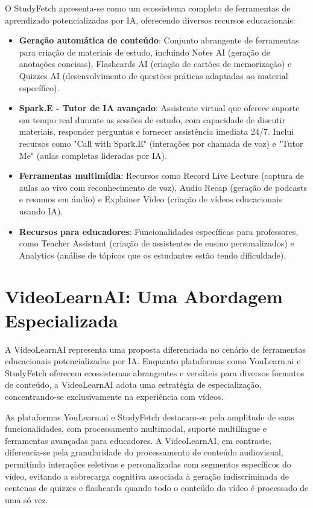 \documentclass[tcc,capa]{texufpel}
\begin{document}
O StudyFetch apresenta-se como um ecossistema completo de ferramentas de aprendizado potencializadas por IA, oferecendo diversos recursos educacionais:

\begin{itemize}
    \item \textbf{Geração automática de conteúdo}: Conjunto abrangente de ferramentas para criação de materiais de estudo, incluindo Notes AI (geração de anotações concisas), Flashcards AI (criação de cartões de memorização) e Quizzes AI (desenvolvimento de questões práticas adaptadas ao material específico).
    
    \item \textbf{Spark.E - Tutor de IA avançado}: Assistente virtual que oferece suporte em tempo real durante as sessões de estudo, com capacidade de discutir materiais, responder perguntas e fornecer assistência imediata 24/7. Inclui recursos como "Call with Spark.E" (interações por chamada de voz) e "Tutor Me" (aulas completas lideradas por IA).
    
    \item \textbf{Ferramentas multimídia}: Recursos como Record Live Lecture (captura de aulas ao vivo com reconhecimento de voz), Audio Recap (geração de podcasts e resumos em áudio) e Explainer Video (criação de vídeos educacionais usando IA).
    
    \item \textbf{Recursos para educadores}: Funcionalidades específicas para professores, como Teacher Assistant (criação de assistentes de ensino personalizados) e Analytics (análise de tópicos que os estudantes estão tendo dificuldade).
\end{itemize}

\section{VideoLearnAI: Uma Abordagem Especializada}

A VideoLearnAI representa uma proposta diferenciada no cenário de ferramentas educacionais potencializadas por IA. Enquanto plataformas como YouLearn.ai e StudyFetch oferecem ecossistemas abrangentes e versáteis para diversos formatos de conteúdo, a VideoLearnAI adota uma estratégia de especialização, concentrando-se exclusivamente na experiência com vídeos.

As plataformas YouLearn.ai e StudyFetch destacam-se pela amplitude de suas funcionalidades, com processamento multimodal, suporte multilíngue e ferramentas avançadas para educadores. A VideoLearnAI, em contraste, diferencia-se pela granularidade do processamento de conteúdo audiovisual, permitindo interações seletivas e personalizadas com segmentos específicos do vídeo, evitando a sobrecarga cognitiva associada à geração indiscriminada de centenas de quizzes e flashcards quando todo o conteúdo do vídeo é processado de uma só vez.
\end{document}

